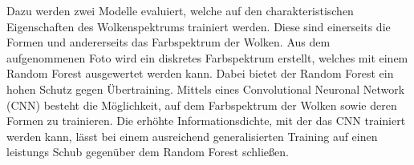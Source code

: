 Dazu werden zwei Modelle evaluiert, welche auf den charakteristischen
Eigenschaften des Wolkenspektrums trainiert werden. 
Diese sind einerseits die Formen und andererseits das Farbspektrum der Wolken.
Aus dem aufgenommenen Foto wird ein diskretes Farbspektrum erstellt, welches 
mit einem Random Forest ausgewertet werden kann.
Dabei bietet der Random Forest ein hohen Schutz gegen Übertraining.
Mittels eines Convolutional Neuronal Network (CNN) besteht die Möglichkeit, auf
dem Farbspektrum der Wolken sowie deren Formen zu trainieren. 
Die erhöhte Informationsdichte, mit der das CNN trainiert werden kann, 
lässt bei einem ausreichend generalisierten Training auf einen leistungs 
Schub gegenüber dem Random Forest schließen.


